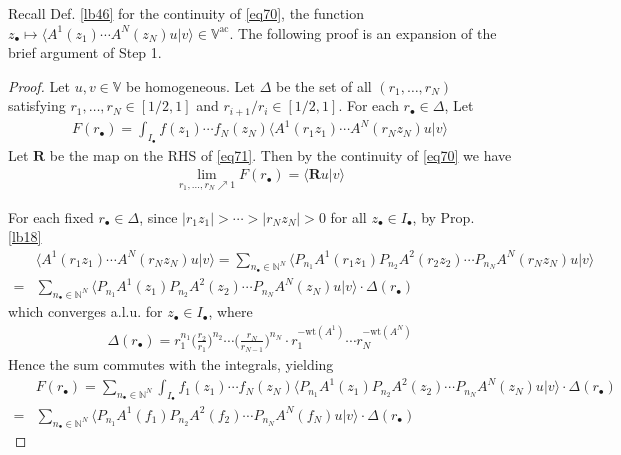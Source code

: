 \documentclass[12pt,b5paper,notitlepage]{article}
\theoremstyle{definition}
\theoremstyle{plain}
\newcommand{\bk}[1]{\langle {#1}\rangle}
\newcommand{\blt}{\bullet}
\newcommand{\Vbb}{\mathbb V}
\newcommand{\Nbb}{\mathbb N}
\newcommand{\Rbf}{\mathbf R}
\newcommand{\wt}{\mathrm{wt}}
\newcommand{\ac}{\mathrm{ac}}
\numberwithin{equation}{section}
\begin{document}
Recall Def. \ref{lb46} for the continuity of \eqref{eq70}, the function $z_\blt\mapsto \bk{A^1(z_1)\cdots A^N(z_N)u|v}\in\Vbb^\ac$. The following proof is an expansion of the brief argument of \cite[p.115]{BS90} Step 1.


\begin{proof}
Let $u,v\in\Vbb$ be homogeneous. Let $\Delta$ be the set of all $(r_1,\dots,r_N)$ satisfying $r_1,\dots,r_N\in[1/2,1]$ and $r_{i+1}/r_i\in[1/2,1]$. For each $r_\blt\in\Delta$, Let
\begin{align*}
F(r_\blt)=\int_{I_\blt}f(z_1)\cdots f_N(z_N)\bk{A^1(r_1z_1)\cdots A^N(r_Nz_N)u|v}
\end{align*}
Let $\Rbf$ be the map on the RHS of \eqref{eq71}. Then by the continuity of \eqref{eq70} we have
\begin{align*}
\lim_{r_1,\dots,r_N\nearrow 1}F(r_\blt)=\bk{\Rbf u|v}
\end{align*}



For each fixed $r_\blt\in\Delta$, since $|r_1z_1|>\cdots>|r_Nz_N|>0$ for all $z_\blt\in I_\blt$, by Prop. \ref{lb18}
\begin{align*}
&\bk{A^1(r_1z_1)\cdots A^N(r_Nz_N)u|v}=\sum_{n_\blt\in\Nbb^N}\bk{P_{n_1}A^1(r_1z_1)P_{n_2}A^2(r_2z_2)\cdots P_{n_N}A^N(r_Nz_N)u|v}\\
=&\sum_{n_\blt\in\Nbb^N}\bk{P_{n_1}A^1(z_1)P_{n_2}A^2(z_2)\cdots P_{n_N}A^N(z_N)u|v}\cdot \Delta(r_\blt)
\end{align*}
which converges a.l.u. for $z_\blt\in I_\blt$, where
\begin{align*}
\Delta(r_\blt)=r_1^{n_1} \Big(\frac{r_2}{r_1}\Big)^{n_2}\cdots  \Big(\frac{r_N}{r_{N-1}}\Big)^{n_N}\cdot r_1^{-\wt(A^1)}\cdots r_N^{-\wt(A^N)}
\end{align*}
Hence the sum commutes with the integrals, yielding
\begin{align*}
&F(r_\blt)=\sum_{n_\blt\in\Nbb^N}\int_{I_\blt}f_1(z_1)\cdots f_N(z_N)\bk{P_{n_1}A^1(z_1)P_{n_2}A^2(z_2)\cdots P_{n_N}A^N(z_N)u|v}\cdot \Delta(r_\blt)\\
=&\sum_{n_\blt\in\Nbb^N}\bk{P_{n_1}A^1(f_1)P_{n_2}A^2(f_2)\cdots P_{n_N}A^N(f_N)u|v}\cdot \Delta(r_\blt)\tag{$\lozenge$}\label{eq72}
\end{align*}




\end{proof}
\end{document}
